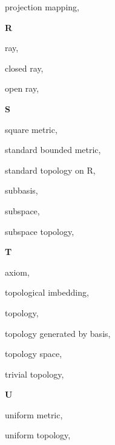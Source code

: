 \begin{multicols}{2}
projection mapping, \pageref{def:ProjectionMapping}

\vspace{1em}\noindent\large{\textbf{R}}

ray, \pageref{def:Ray}

\hspace{1em}closed ray, \pageref{def:Ray}

\hspace{1em}open ray, \pageref{def:Ray}

\vspace{1em}\noindent\large{\textbf{S}}

square metric, \pageref{def:SquareMetric}

standard bounded metric, \pageref{def:StandardBoundedMetric}

standard topology on R, \pageref{def:StandardTopologyOnTheRealLine}

subbasis, \pageref{def:Subbasis}

subspace, \pageref{def:SubspaceTopology}

subspace topology, \pageref{def:SubspaceTopology}

\vspace{1em}\noindent\large{\textbf{T}}

 axiom, \pageref{def:T1Axiom}

topological imbedding, \pageref{def:TopologicalImbedding}

topology, \pageref{def:Topology}

topology generated by basis, \pageref{def:TopologyGeneratedByBasis}

topology space, \pageref{def:TopologySpace}

trivial topology, \pageref{def:TrivialTopology}

\vspace{1em}\noindent\large{\textbf{U}}

uniform metric, \pageref{def:UniformMetric}

uniform topology, \pageref{def:UniformMetric}

\end{multicols}